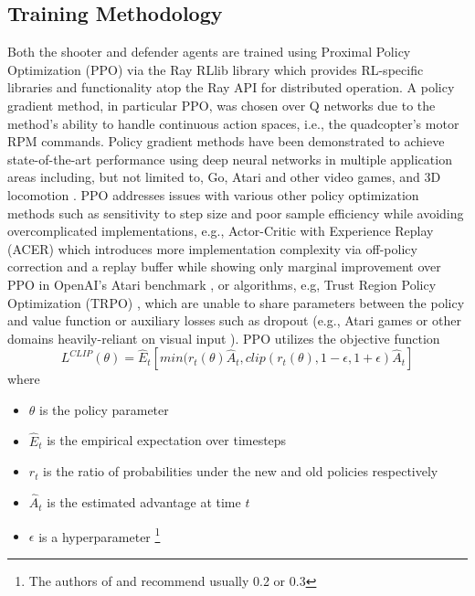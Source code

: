 \documentclass{article}
\begin{document}
\subsection{Training Methodology}\label{subsec:train_methods}
Both the shooter and defender agents are trained using Proximal Policy Optimization (PPO) \cite{Schulman2017} via the Ray RLlib library \cite{Liang2017} which provides RL-specific libraries and functionality atop the Ray API for distributed operation.
A policy gradient method, in particular PPO, was chosen over Q networks due to the method's ability to handle continuous action spaces, i.e., the quadcopter's motor RPM commands. 
Policy gradient methods have been demonstrated to achieve state-of-the-art performance using deep neural networks in multiple application areas including, but not limited to, Go, Atari and other video games, and 3D locomotion \cite{ppo_site}. 
PPO addresses issues with various other policy optimization methods such as sensitivity to step size and poor sample efficiency while avoiding overcomplicated implementations, e.g., Actor-Critic with Experience Replay (ACER) \cite{wang2017sample} which introduces more implementation complexity via off-policy correction and a replay buffer while showing only marginal improvement over PPO in OpenAI's Atari benchmark \cite{ppo_site}, or algorithms, e.g, Trust Region Policy Optimization (TRPO) \cite{schulman2017trust}, which are unable to share parameters between the policy and value function or auxiliary losses such as dropout (e.g., Atari games or other domains heavily-reliant on visual input \cite{ppo_site}). 
PPO utilizes the objective function
\begin{equation} \label{eq:ppo_loss}
L^{CLIP}(\theta) = \hat{E}_t[min(r_t(\theta) \hat{A}_t , clip(r_t(\theta), 1-\epsilon, 1+\epsilon) \hat{A}_t]
\end{equation}
where
\begin{itemize}
\item $\theta$ is the policy parameter
\item $\hat{E}_t$ is the empirical expectation over timesteps
\item $r_t$ is the ratio of probabilities under the new and old policies respectively
\item $\hat{A}_t$ is the estimated advantage at time $t$ 
\item $\epsilon$ is a hyperparameter \footnote{The authors of \cite{Schulman2017} and \cite{ppo_site} recommend usually 0.2 or 0.3}
\end{itemize}
\end{document}
